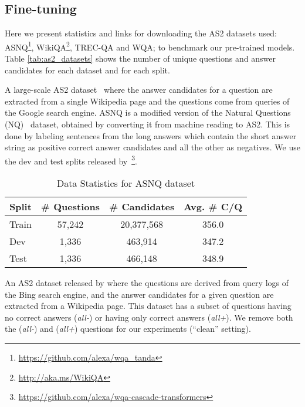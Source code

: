 \subsection{Fine-tuning}
Here we present statistics and links for downloading the AS2 datasets used: ASNQ\footnote{\url{https://github.com/alexa/wqa_tanda}}, WikiQA\footnote{\url{http://aka.ms/WikiQA}}, TREC-QA and WQA; to benchmark our pre-trained models. Table \ref{tab:as2_datasets} shows the number of unique questions and answer candidates for each dataset and for each split.

\iffalse
{} A large-scale AS2 dataset~\cite{garg2019tanda} where the answer candidates for a question are extracted from a single Wikipedia page and the questions come from queries of the Google search engine. ASNQ is a modified version of the Natural Questions (NQ)~\cite{kwiatkowski-etal-2019-natural} dataset, obtained by converting it from machine reading to AS2. This is done by labeling sentences from the long answers which contain the short answer string as positive correct answer candidates and all the other as negatives. We use the dev and test splits released by~\citeauthor{soldaini-moschitti-2020-cascade}\footnote{\url{https://github.com/alexa/wqa-cascade-transformers}}.

\begin{table}[h!]
\centering
\small
\begin{tabular}{lccc}
\hline
    \textbf{Split} & \textbf{\# Questions} & \textbf{\# Candidates} & \textbf{Avg. \# C/Q} \\
    \hline
    Train   & 57,242 & 20,377,568 & 356.0 \\
    Dev     & 1,336  & 463,914    & 347.2 \\
    Test    & 1,336  & 466,148    & 348.9 \\ \hline
\end{tabular}
\caption{Data Statistics for ASNQ dataset}
\vspace{1em}
\label{tab:asnq}
\end{table}


 An AS2 dataset released by \citeauthor{yang2015wikiqa} where the questions are derived from query logs of the Bing search engine, and the answer candidates for a given question are extracted from a Wikipedia page. This dataset has a subset of questions having no correct answers (\textit{all-}) or having only correct answers (\textit{all+}). We remove both the (\textit{all-}) and (\textit{all+}) questions for our experiments (``clean'' setting).

